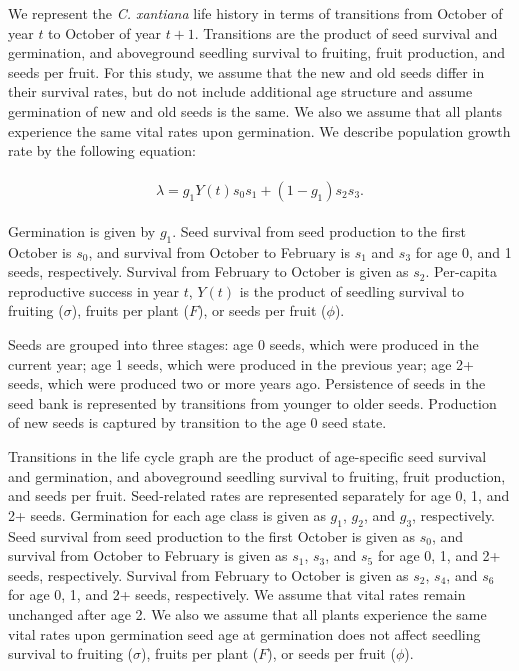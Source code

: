 \documentclass[12pt, oneside, titlepage]{article}   	%
\begin{document}
{We represent the \textit{C. xantiana} life history in terms of transitions from October of year $t$ to October of year $t+1$. Transitions are the product of seed survival and germination, and aboveground seedling survival to fruiting, fruit production, and seeds per fruit. For this study, we assume that the new and old seeds differ in their survival rates, but do not include additional age structure and assume germination of new and old seeds is the same. We also we assume that all plants experience the same vital rates upon germination. We describe population growth rate by the following equation:

 \begin{align}
  \begin{split}
\lambda = g_1Y(t) s_0 s_1 + (1-g_1) s_2 s_3.  \label{eq:di-equation}
  \end{split}
\end{align}

Germination is given by $g_1$. Seed survival from seed production to the first October is $s_0$, and survival from October to February is $s_1$ and $s_3$ for age 0, and 1 seeds, respectively. Survival from February to October is given as $s_2$. Per-capita reproductive success in year $t$, $Y(t)$ is the product of seedling survival to fruiting ($\sigma$), fruits per plant ($F$), or seeds per fruit ($\phi$).

\iffalse
 Seeds are grouped into three stages: age 0 seeds, which were produced in the current year; age 1 seeds, which were produced in the previous year; age 2+ seeds, which were produced two or more years ago. Persistence of seeds in the seed bank is represented by transitions from younger to older seeds. Production of new seeds is captured by transition to the age 0 seed state. 
 
Transitions in the life cycle graph are the product of age-specific seed survival and germination, and aboveground seedling survival to fruiting, fruit production, and seeds per fruit. Seed-related rates are represented separately for age 0, 1, and 2+ seeds. Germination for each age class is given as $g_1$, $g_2$, and $g_3$, respectively. Seed survival from seed production to the first October is given as $s_0$, and survival from October to February is given as $s_1$, $s_3$, and $s_5$ for age 0, 1, and 2+ seeds, respectively. Survival from February to October is given as $s_2$, $s_4$, and $s_6$ for age 0, 1, and 2+ seeds, respectively. We assume that vital rates remain unchanged after age 2. We also we assume that all plants experience the same vital rates upon germination seed age at germination does not affect seedling survival to fruiting ($\sigma$), fruits per plant ($F$), or seeds per fruit ($\phi$).

}
\end{document}
